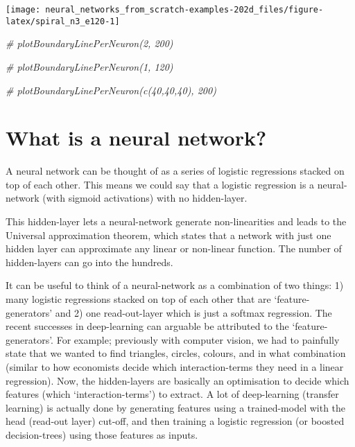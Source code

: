 \documentclass[]{book}
\newenvironment{Shaded}{\begin{snugshade}}{\end{snugshade}}
\newcommand{\CommentTok}[1]{\textcolor[rgb]{0.56,0.35,0.01}{\textit{#1}}}
\begin{document}
\begin{center}\texttt{[image: neural\_networks\_from\_scratch-examples-202d\_files/figure-latex/spiral\_n3\_e120-1]} \end{center}

\begin{Shaded}
\begin{Highlighting}[]
\CommentTok{# plotBoundaryLinePerNeuron(2, 200)}
\end{Highlighting}
\end{Shaded}

\begin{Shaded}
\begin{Highlighting}[]
\CommentTok{# plotBoundaryLinePerNeuron(1, 120)}
\end{Highlighting}
\end{Shaded}

\begin{Shaded}
\begin{Highlighting}[]
\CommentTok{# plotBoundaryLinePerNeuron(c(40,40,40), 200)}
\end{Highlighting}
\end{Shaded}

\hypertarget{what-is-a-neural-network}{%
\section{What is a neural network?}\label{what-is-a-neural-network}}

A neural network can be thought of as a series of logistic regressions stacked on top of each other. This means we could say that a logistic regression is a neural-network (with sigmoid activations) with no hidden-layer.

This hidden-layer lets a neural-network generate non-linearities and leads to the Universal approximation theorem, which states that a network with just one hidden layer can approximate any linear or non-linear function. The number of hidden-layers can go into the hundreds.

It can be useful to think of a neural-network as a combination of two things: 1) many logistic regressions stacked on top of each other that are `feature-generators' and 2) one read-out-layer which is just a softmax regression. The recent successes in deep-learning can arguable be attributed to the `feature-generators'. For example; previously with computer vision, we had to painfully state that we wanted to find triangles, circles, colours, and in what combination (similar to how economists decide which interaction-terms they need in a linear regression). Now, the hidden-layers are basically an optimisation to decide which features (which `interaction-terms') to extract. A lot of deep-learning (transfer learning) is actually done by generating features using a trained-model with the head (read-out layer) cut-off, and then training a logistic regression (or boosted decision-trees) using those features as inputs.
\end{document}

